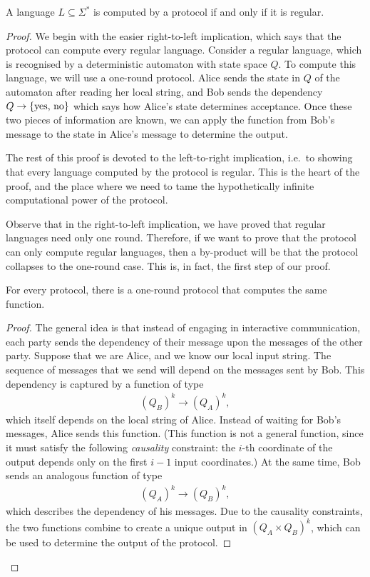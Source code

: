 \begin{theorem}
  A language $L \subseteq \Sigma^*$ is computed by a protocol if and only if it is regular.
\end{theorem}
\begin{proof}
  We begin with the easier right-to-left implication, which says that the protocol can compute every regular language. Consider a regular language, which is recognised by a deterministic automaton with state space $Q$. To compute this language, we will use a  one-round protocol. Alice sends the state in $Q$ of the automaton after reading her local string, and Bob sends the dependency $Q \to \{\text{yes, no}\}$ which says how Alice's state determines acceptance. Once these two pieces of information are known, we can apply the function from Bob's message to the state in Alice's message to determine the output.

  The rest of this proof is devoted to the left-to-right implication, i.e.~to showing that every language computed by the protocol is regular. This is the heart of the proof, and the place where we need to tame the hypothetically infinite computational power of the protocol. 
  
  Observe that in the right-to-left implication, we have proved that regular languages need only one round. Therefore, if we want to  prove that the protocol can only compute regular languages, then a by-product will be that the protocol collapses to the one-round case.  This is, in fact, the first step of our proof. 
  \begin{lemma}\label{lem:one-round-reduction-boolean}
    For every protocol, there is a one-round protocol that computes the same function. 
  \end{lemma}
  \begin{proof}
    The general idea is that instead of engaging in interactive communication, each party sends the dependency of their message upon the messages of the other party. Suppose that we are  Alice, and we know our local input string. The sequence of messages that we send will depend on the messages sent by Bob. This dependency is captured by a function of type 
    \begin{align*}
    (Q_B)^k \to (Q_A)^k,
    \end{align*}
    which  itself depends on the local string of Alice.  Instead of waiting for Bob's messages, Alice sends this function. (This function is not a general function, since it must satisfy the following \emph{causality} constraint: the $i$-th coordinate of the output depends only on the first $i-1$ input coordinates.) At the same time, Bob sends an analogous function of type 
    \begin{align*}
    (Q_A)^k \to (Q_B)^k,
    \end{align*}
    which describes the dependency of his messages. Due to the causality constraints, the two functions combine to create a unique output in $(Q_A \times Q_B)^k$, which can be used to determine the output of the protocol.
  \end{proof}


\end{proof}
